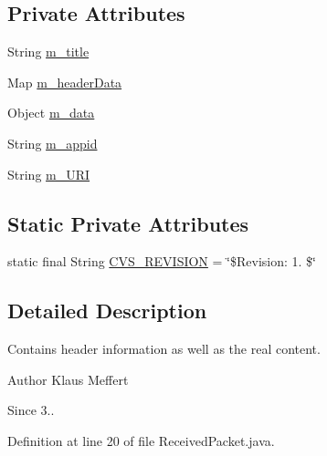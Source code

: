 \subsection*{Private Attributes}
\begin{DoxyCompactItemize}
\item 
String \hyperlink{classorg_1_1jgap_1_1distr_1_1grid_1_1wan_1_1_received_packet_a421b11c0db76e89f3cc0cf0b2fc09518}{m\-\_\-title}
\item 
Map \hyperlink{classorg_1_1jgap_1_1distr_1_1grid_1_1wan_1_1_received_packet_a5ac465938542016d1dbc87cb140e848d}{m\-\_\-header\-Data}
\item 
Object \hyperlink{classorg_1_1jgap_1_1distr_1_1grid_1_1wan_1_1_received_packet_a125c360bf245e271f8748c8043060ca3}{m\-\_\-data}
\item 
String \hyperlink{classorg_1_1jgap_1_1distr_1_1grid_1_1wan_1_1_received_packet_aa923449981d9796ac53ff80caee8782a}{m\-\_\-appid}
\item 
String \hyperlink{classorg_1_1jgap_1_1distr_1_1grid_1_1wan_1_1_received_packet_a9e6aceeae569c837c19163fa9bf07f98}{m\-\_\-\-U\-R\-I}
\end{DoxyCompactItemize}
\subsection*{Static Private Attributes}
\begin{DoxyCompactItemize}
\item 
static final String \hyperlink{classorg_1_1jgap_1_1distr_1_1grid_1_1wan_1_1_received_packet_a891027cdf2060c3fb70a2b59ce56dd1b}{C\-V\-S\-\_\-\-R\-E\-V\-I\-S\-I\-O\-N} = \char`\"{}\$Revision\-: 1. \$\char`\"{}
\end{DoxyCompactItemize}


\subsection{Detailed Description}
Contains header information as well as the real content.

\begin{DoxyAuthor}{Author}
Klaus Meffert 
\end{DoxyAuthor}
\begin{DoxySince}{Since}
3.. 
\end{DoxySince}


Definition at line 20 of file Received\-Packet.\-java.



